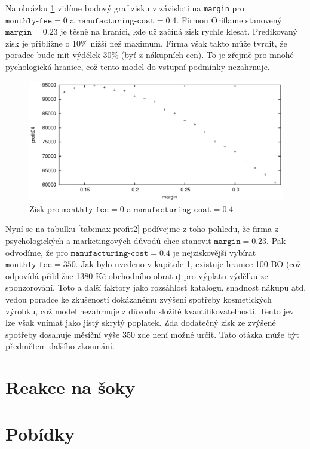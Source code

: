 \documentclass[a4wide,12pt]{report}
\begin{document}
Na obrázku \ref{fig:max-profit-04-f0} vidíme bodový graf zisku v závisloti na \texttt{margin} pro $\texttt{monthly-fee}=0$ a $\texttt{manufacturing-cost}=0.4$. Firmou Oriflame stanovený $\texttt{margin}=0.23$ je těsně na hranici, kde už začíná zisk rychle klesat. Predikovaný zisk je přibližne o 10\% nižší než maximum. Firma však takto může tvrdit, že poradce bude mít výdělek 30\% (byť z nákupních cen). To je zřejmě pro mnohé pychologická hranice, což tento model do vstupní podmínky nezahrnuje.
\begin{figure}[h]
  \centering
  \includegraphics{max-profit-04-f0.eps}
  \caption{Zisk pro $\texttt{monthly-fee}=0$ a $\texttt{manufacturing-cost}=0.4$}
  \label{fig:max-profit-04-f0}
\end{figure}

Nyní se na tabulku \ref{tab:max-profit2} podívejme z toho pohledu, že firma z psychologických a marketingových důvodů chce stanovit $\texttt{margin}=0.23$. Pak odvodíme, že pro $\texttt{manufacturing-cost}=0.4$ je nejziskovější vybírat $\texttt{monthly-fee}=350$. Jak bylo uvedeno v kapitole 1, existuje hranice 100 BO (což odpovídá přibližne 1380 Kč obchodního obratu) pro výplatu výdělku ze sponzorování. Toto a další faktory jako rozsáhlost katalogu, snadnost nákupu atd. vedou poradce ke zkušeností dokázanému zvýšení spotřeby kosmetických výrobku, což model nezahrnuje z důvodu složité kvantifikovatelnosti. Tento jev lze však vnímat jako jistý skrytý poplatek. Zda dodatečný zisk ze zvýšené spotřeby dosahuje měsíční výše 350 zde není možné určit. Tato otázka může být předmětem dalšího zkoumání.

\section{Reakce na šoky}
\section{Pobídky}
\end{document}
